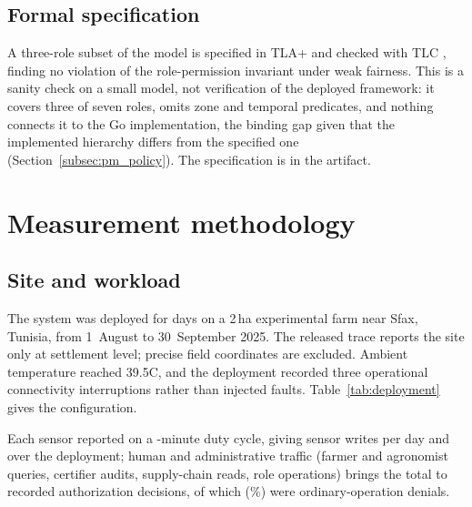 \documentclass[a4paper,fleqn]{cas-dc}
\begin{document}
\subsection{Formal specification}
\label{subsec:tla}

A three-role subset of the model is specified in TLA+ and checked with TLC
\cite{lamport2002specifying,newcombe2015amazon}, finding no violation of
the role-permission invariant under weak fairness. This is a sanity check
on a small model, not verification of the deployed framework: it covers
three of seven roles, omits zone and temporal predicates, and nothing
connects it to the Go implementation, the binding gap given that the
implemented hierarchy differs from the specified one
(Section~\ref{subsec:pm_policy}). The specification is in the artifact.

\FloatBarrier
\section{Measurement methodology}
\label{sec:method}

\subsection{Site and workload}
\label{subsec:deployment}

The system was deployed for \DeployDays{} days on a 2\,ha experimental
farm near Sfax, Tunisia, from 1~August to 30~September 2025. The released
trace reports the site only at settlement level; precise field coordinates
are excluded. Ambient temperature reached 39.5\textdegree{}C, and the
deployment recorded three operational connectivity interruptions rather
than injected faults. Table~\ref{tab:deployment} gives the configuration.

Each sensor reported on a \DutyCycleMinutes-minute duty cycle, giving
\WritesPerDay{} sensor writes per day and \SensorWrites{} over the
deployment; human and administrative traffic (farmer and agronomist
queries, certifier audits, supply-chain reads, role operations) brings the
total to \TotalDecisions{} recorded authorization decisions, of which
\TotalDenied{} (\DenyRatePct\%) were ordinary-operation denials.
\end{document}
